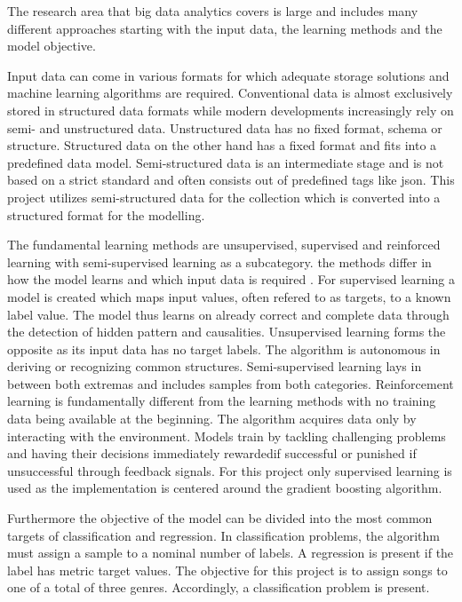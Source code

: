 The research area that big data analytics covers is large and includes many different approaches
starting with the input data, the learning methods and the model objective. 

Input data can come in various formats for which adequate storage solutions and machine learning 
algorithms are required. Conventional data is almost exclusively stored in structured data formats 
while modern developments increasingly rely on semi- and unstructured data. Unstructured data has no
fixed format, schema or structure. Structured data on the other hand has a fixed format and fits into 
a predefined data model. Semi-structured data is an intermediate stage and is not based on a strict
standard and often consists out of predefined tags like json. This project utilizes semi-structured 
data for the collection which is converted into a structured format for the modelling. 

The fundamental learning methods are unsupervised, supervised and reinforced learning with 
semi-supervised learning as a subcategory. the methods differ in how the model learns and which 
input data is required \cite[4]{2018VDMAQuick}. For supervised learning a model is created which 
maps input values, often refered to as targets, to a known label value. The model thus learns 
on already correct and complete data through the detection of hidden pattern and causalities. 
Unsupervised learning forms the opposite as its input data has no target labels. The algorithm 
is autonomous in deriving or recognizing common structures. Semi-supervised learning lays in 
between both extremas and includes samples from both categories. Reinforcement learning is 
fundamentally different from the learning methods with no training data being available at the 
beginning. The algorithm acquires data only by interacting with the environment. Models train by 
tackling challenging problems and having their decisions immediately rewardedif successful or 
punished if unsuccessful through feedback signals. For this project only supervised learning is 
used as the implementation is centered around the gradient boosting algorithm. 

Furthermore the objective of the model can be divided into the most common targets of classification 
and regression. In classification problems, the algorithm must assign a sample to a nominal number of labels. 
A regression is present if the label has metric target values\cite[46]{Paass2020}. The objective for this 
project is to assign songs to one of a total of three genres. Accordingly, a classification problem is 
present. 

